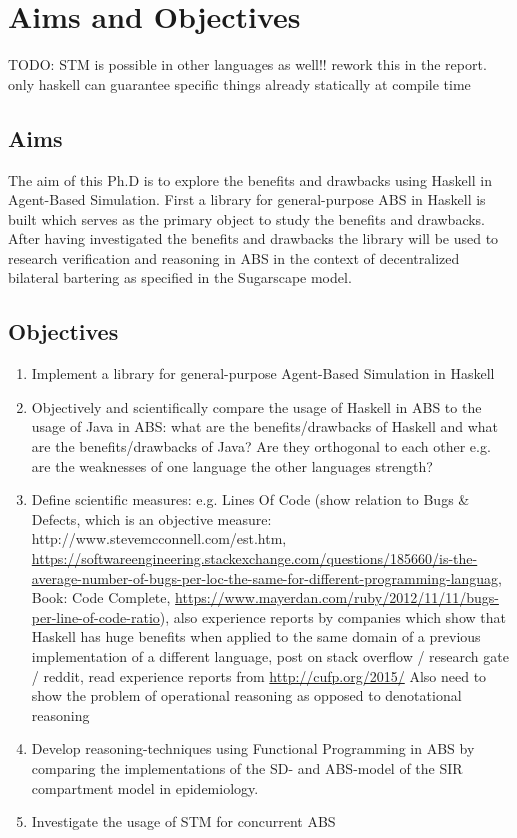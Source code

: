 \chapter{Aims and Objectives}
\label{chap:aimsObj}

TODO:
STM is possible in other languages as well!! rework this in the report. only haskell can guarantee specific things already statically at compile time

\section{Aims}
The aim of this Ph.D is to explore the benefits and drawbacks using Haskell in  Agent-Based Simulation. First a library for general-purpose ABS in Haskell is built which serves as the primary object to study the benefits and drawbacks. After having investigated the benefits and drawbacks the library will be used to research  verification and reasoning in ABS in the context of decentralized bilateral bartering as specified in the Sugarscape model.

\section{Objectives}
\begin{enumerate}
	\item Implement a library for general-purpose Agent-Based Simulation in Haskell 
	\item Objectively and scientifically compare the usage of Haskell in ABS to the usage of Java in ABS: what are the benefits/drawbacks of Haskell and what are the benefits/drawbacks of Java? Are they orthogonal to each other e.g. are the weaknesses of one language the other languages strength?
	\item Define scientific measures: e.g. Lines Of Code (show relation to Bugs \& Defects, which is an objective measure: http://www.stevemcconnell.com/est.htm, \url{https://softwareengineering.stackexchange.com/questions/185660/is-the-average-number-of-bugs-per-loc-the-same-for-different-programming-languag}, Book: Code Complete, \url{https://www.mayerdan.com/ruby/2012/11/11/bugs-per-line-of-code-ratio}), also experience reports by companies which show that Haskell has huge benefits when applied to the same domain of a previous implementation of a different language, post on stack overflow / research gate / reddit, read experience reports from \url{http://cufp.org/2015/} Also need to show the problem of operational reasoning as opposed to denotational reasoning
	\item Develop reasoning-techniques using Functional Programming in ABS by comparing the implementations of the SD- and ABS-model of the SIR compartment model in epidemiology.
	\item Investigate the usage of STM for concurrent ABS
\end{enumerate}

